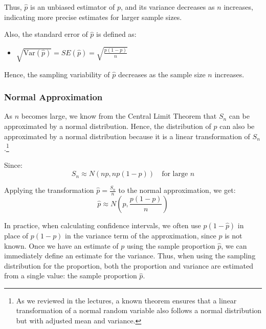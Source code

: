 \documentclass[11pt]{article}
\begin{document}
Thus, \( \hat{p} \) is an unbiased estimator of \( p \), and its variance decreases as \( n \) increases, indicating more precise estimates for larger sample sizes. \newline

Also, the standard error of $\hat{p}$ is defined as:
\begin{itemize}
    \item \( \sqrt{\text{Var}(\hat{p})} = SE(\hat{p}) = \sqrt{\frac{p(1-p)}{n}}  \)
\end{itemize}

Hence, the sampling variability of $\hat{p}$ decreases as the sample size $n$ increases.

\subsubsection*{Normal Approximation}
As \( n \) becomes large, we know from the Central Limit Theorem that \( S_n \) can be approximated by a normal distribution. Hence, the distribution of \( \hat{p} \) can also be approximated by a normal distribution because it is a linear transformation of \( S_n \).\footnote{As we reviewed in the lectures, a known theorem ensures that a linear transformation of a normal random variable also follows a normal distribution but with adjusted mean and variance.}

Since:
\[ S_n \approx N(np, np(1-p)) \quad \text{for large } n \]

Applying the transformation \( \hat{p} = \frac{S_n}{n} \) to the normal approximation, we get:
\[ \hat{p} \approx N\left(p, \frac{p(1-p)}{n}\right) \]

In practice, when calculating confidence intervals, we often use \( \hat{p}(1-\hat{p}) \) in place of \( p(1-p) \) in the variance term of the approximation, since \( p \) is not known. Once we have an estimate of \( p \) using the sample proportion \(\hat{p}\), we can immediately define an estimate for the variance. Thus, when using the sampling distribution for the proportion, both the proportion and variance are estimated from a single value: the sample proportion \(\hat{p}\).
\end{document}
